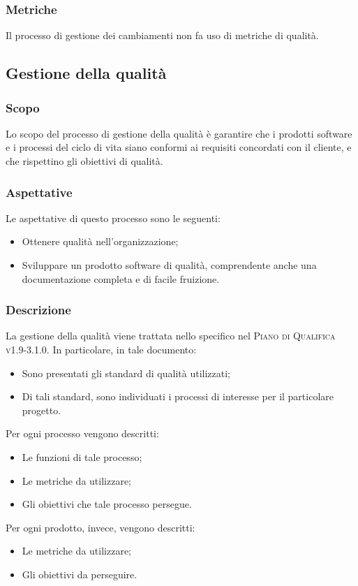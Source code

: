 \documentclass[../norme-di-progetto.tex]{subfiles}
\begin{document}
\subsubsection{Metriche}
Il processo di gestione dei cambiamenti non fa uso di metriche di qualità.

\subsection{Gestione della qualità}
\subsubsection{Scopo}
Lo scopo del processo di gestione della qualità è garantire che i prodotti software e i processi del ciclo di vita siano conformi ai requisiti concordati con il cliente, e che rispettino gli obiettivi di qualità.
\subsubsection{Aspettative}
Le aspettative di questo processo sono le seguenti:
\begin{itemize}
  \item Ottenere qualità nell'organizzazione;
  \item Sviluppare un prodotto software di qualità, comprendente anche una documentazione completa e di facile fruizione.
\end{itemize}
\subsubsection{Descrizione}
La gestione della qualità viene trattata nello specifico nel \textsc{Piano di Qualifica v1.9-3.1.0}. In particolare, in tale documento:
\begin{itemize}
  \item Sono presentati gli standard di qualità utilizzati;
  \item Di tali standard, sono individuati i processi di interesse per il particolare progetto.
\end{itemize}
Per ogni processo vengono descritti:
\begin{itemize}
  \item Le funzioni di tale processo;
  \item Le metriche da utilizzare;
  \item Gli obiettivi che tale processo persegue.
\end{itemize}
Per ogni prodotto, invece, vengono descritti:
\begin{itemize}
  \item Le metriche da utilizzare;
  \item Gli obiettivi da perseguire.
\end{itemize}
\end{document}

